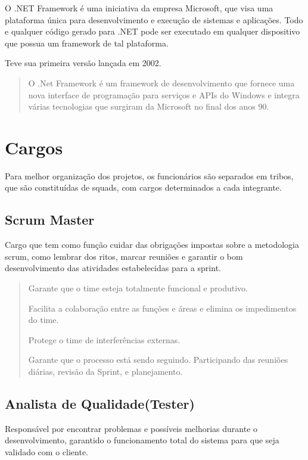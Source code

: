 O .NET Framework é uma iniciativa da empresa Microsoft, que visa uma plataforma única para desenvolvimento e execução de sistemas e aplicações.
Todo e qualquer código gerado para .NET pode ser executado em qualquer dispositivo que possua um framework de tal plataforma.

Teve sua primeira versão lançada em 2002.

\begin{quote}
  
O .Net Framework é um framework de desenvolvimento que fornece uma nova interface de programação para serviços e APIs do Windows e integra várias tecnologias que surgiram da Microsoft no final dos anos 90. \cite{thai2003net}
\end{quote}

\section{Cargos}

Para melhor organização dos projetos, os funcionários são separados em tribos, que são constituídas de squads, com cargos determinados a cada integrante.

\subsection{Scrum Master}

Cargo que tem como função cuidar das obrigações impostas sobre a metodologia scrum, como lembrar dos ritos, marcar reuniões e garantir o bom desenvolvimento das atividades estabelecidas para a sprint.

\begin{quote}
Garante que o time esteja
totalmente funcional e
produtivo.

Facilita a colaboração entre as
funções e áreas e elimina os
impedimentos do time.

Protege o time de
interferências externas.

Garante que o processo está
sendo seguindo. Participando
das reuniões diárias, revisão
da Sprint, e planejamento. \cite{sabbagh2014scrum}

\end{quote}

\subsection{Analista de Qualidade(Tester)}

Responsável por encontrar problemas e possíveis melhorias durante o desenvolvimento, garantido o funcionamento total do sistema para que seja validado com o cliente.

